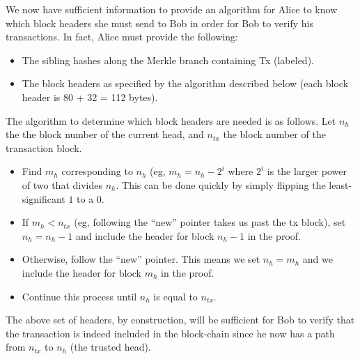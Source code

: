 \documentclass[12pt]{exam}
\begin{document}
\begin{questions}
\begin{solution}
\begin{enumerate}[label=\textbf{\alph*.}]
    We now have sufficient information to provide an algorithm for Alice to know which block headers she must send to Bob in order for Bob to verify his transactions. In fact, Alice must provide the following:
    \begin{itemize}
      \item The sibling hashes along the Merkle branch containing Tx (labeled).
      \item The block headers as specified by the algorithm described below (each block header is 80 + 32 = 112 bytes).
    \end{itemize}

    The algorithm to determine which block headers are needed is as follows. Let $n_h$ the the block number of the current head, and $n_{tx}$ the block number of the transaction block.
    \begin{itemize}
      \item Find $m_{h}$ corresponding to $n_{h}$ (eg, $m_h = n_h - 2^i$ where $2^i$ is the larger power of two that divides $n_h$. This can be done quickly by simply flipping the least-significant $1$ to a $0$.
      \item If $m_h < n_{tx}$ (eg, following the ``new'' pointer takes us past the tx block), set $n_{h} = n_h - 1$ and include the header for block $n_h - 1$ in the proof.
      \item Otherwise, follow the ``new'' pointer. This means we set $n_h = m_h$ and we include the header for block $m_h$ in the proof.
      \item Continue this process until $n_h$ is equal to $n_{tx}$.
    \end{itemize}

    The above set of headers, by construction, will be sufficient for Bob to verify that the transaction is indeed included in the block-chain since he now has a path from $n_{tx}$ to $n_h$ (the trusted head).


\end{enumerate}
\end{solution}
\end{questions}
\end{document}
